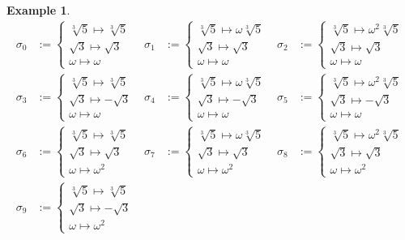 \documentclass[leqno]{article}
\theoremstyle{definition}
\theoremstyle{remark}
\theoremstyle{definition}
\newtheorem{example}{Example}
\begin{document}
\begin{example}
\begin{align*}
                                \sigma_0&:=\begin{cases} \sqrt[3]{5}\mapsto\sqrt[3]{5} \\ \sqrt{3}\mapsto\sqrt{3} \\\omega\mapsto\omega\end{cases} & \sigma_1&:=\begin{cases} \sqrt[3]{5}\mapsto\omega\sqrt[3]{5}\\\sqrt{3}\mapsto\sqrt{3}\\\omega\mapsto\omega\end{cases} & \sigma_2&:=\begin{cases}\sqrt[3]{5}\mapsto\omega^2\sqrt[3]{5}\\\sqrt{3}\mapsto\sqrt{3}\\\omega\mapsto\omega \end{cases} \\ \sigma_3&:=\begin{cases} \sqrt[3]{5}\mapsto\sqrt[3]{5}\\\sqrt{3}\mapsto-\sqrt{3}\\\omega\mapsto\omega\end{cases} & \sigma_4&:=\begin{cases} \sqrt[3]{5}\mapsto\omega\sqrt[3]{5}\\\sqrt{3}\mapsto-\sqrt{3}\\\omega\mapsto\omega\end{cases} & \sigma_5&:=\begin{cases} \sqrt[3]{5}\mapsto\omega^2\sqrt[3]{5}\\\sqrt{3}\mapsto-\sqrt{3}\\\omega\mapsto\omega\end{cases} \\ \sigma_6&:=\begin{cases} \sqrt[3]{5}\mapsto\sqrt[3]{5}\\\sqrt{3}\mapsto\sqrt{3}\\\omega\mapsto\omega^2\end{cases} & \sigma_7&:=\begin{cases} \sqrt[3]{5}\mapsto\omega\sqrt[3]{5}\\\sqrt{3}\mapsto\sqrt{3}\\\omega\mapsto\omega^2\end{cases} & \sigma_8&:=\begin{cases} \sqrt[3]{5}\mapsto\omega^2\sqrt[3]{5}\\\sqrt{3}\mapsto\sqrt{3}\\\omega\mapsto\omega^2\end{cases} \\ \sigma_9&:=\begin{cases} \sqrt[3]{5}\mapsto\sqrt[3]{5}\\\sqrt{3}\mapsto-\sqrt{3}\\\omega\mapsto\omega^2\end{cases} & 
\end{align*}
\end{example}
\end{document}
